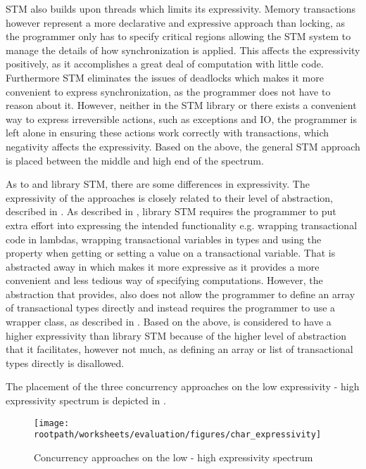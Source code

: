 \ac{STM} also builds upon threads which limits its expressivity. Memory transactions however represent a more declarative and expressive approach than locking, as the programmer only has to specify critical regions allowing the \ac{STM} system to manage the details of how synchronization is applied. This affects the expressivity positively, as it accomplishes a great deal of computation with little code. Furthermore \ac{STM} eliminates the issues of deadlocks which makes it more convenient to express synchronization, as the programmer does not have to reason about it. However, neither in the \ac{STM} library or \stmname there exists a convenient way to express irreversible actions, such as exceptions and \ac{IO}, the programmer is left alone in ensuring these actions work correctly with transactions, which negativity affects the expressivity. Based on the above, the general \ac{STM} approach is placed between the middle and high end of the spectrum.

As to \stmname and library \ac{STM}, there are some differences in expressivity. The expressivity of the approaches is closely related to their level of abstraction, described in . As described in , library \ac{STM} requires the programmer to put extra effort into expressing the intended functionality e.g. wrapping transactional code in lambdas, wrapping transactional variables in  types and using the  property when getting or setting a value on a transactional variable. That is abstracted away in \stmname which makes it more expressive as it provides a more convenient and less tedious way of specifying computations. However, the abstraction that \stmname provides, also does not allow the programmer to define an array of transactional types directly and instead requires the programmer to use a wrapper class, as described in . Based on the above, \stmname is considered to have a higher expressivity than library \ac{STM} because of the higher level of abstraction that it facilitates, however not much, as defining an array or list of transactional types directly is disallowed.

The placement of the three concurrency approaches on the low expressivity - high expressivity spectrum is depicted in . 

\begin{figure}[htbp]
\centering
 \texttt{[image: \\rootpath/worksheets/evaluation/figures/char\_expressivity]} 
 \caption{Concurrency approaches on the low - high expressivity spectrum}
\label{fig:char_expressivity}
\end{figure}


